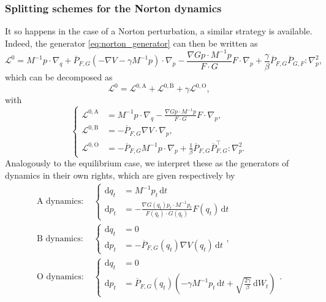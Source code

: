 \documentclass[pdflatex,sn-mathphys]{sn-jnl}%
\theoremstyle{thmstyleone}%
\theoremstyle{thmstyletwo}%
\theoremstyle{thmstylethree}%
\renewcommand{\d}{\mathrm{d}}
\newcommand{\cL}{\mathcal{L}}
\newcommand{\1}{\mathbbm{1}}
\begin{document}
\subsubsection{Splitting schemes for the Norton dynamics}
It so happens in the case of a Norton perturbation, a similar strategy is available. Indeed, the generator \eqref{eq:norton_generator} can then be written as
\begin{equation}
    \label{eq:norton_generator_langevin}
    \cL^0 = M^{-1}p\cdot \nabla_q + \overline{P}_{F,G}\left(-\nabla V -\gamma M^{-1}p\right)\cdot \nabla_p - \frac{\nabla G p \cdot M^{-1} p }{F\cdot G} F \cdot \nabla_p +\frac{\gamma}{\beta} \overline{P}_{F,G}\overline{P}_{G,F}:\nabla^2_p,
\end{equation}
which can be decomposed as
\begin{equation}
    \label{eq:norton_generator_splitting}
    \cL^{0} = \cL^{0,\mathrm{A}}+\cL^{0,\mathrm{B}}+\gamma\cL^{0,\mathrm{O}},
\end{equation}
with
\begin{equation}
    \label{eq:norton_generator_splitting_parts}
    \left\{
    \begin{aligned}
    \cL^{0,\mathrm{A}}&=M^{-1}p\cdot \nabla_q -\frac{\nabla G p \cdot M^{-1}p}{F\cdot G}F \cdot \nabla_p,\\
    \cL^{0,\mathrm{B}}&=-\overline{P}_{F,G}\nabla V\cdot \nabla_p,\\
    \cL^{0,\mathrm{O}}&=-\overline{P}_{F,G}M^{-1}p\cdot \nabla_p +\frac{1}{\beta} \overline{P}_{F,G}\overline{P}_{F,G}^\intercal:\nabla_p^2.
    \end{aligned}\right.
\end{equation}
Analogously to the equilibrium case, we interpret these as the generators of dynamics in their own rights, which are given respectively by
\begin{equation}
   \begin{aligned}
        \text{$\mathrm{A}$ dynamics: }&\left\{\begin{aligned}
            \d q_t &= M^{-1}p_t \,\d t\\
            \d p_t &= -\frac{\nabla G(q_t)p_t\cdot M^{-1}p_t}{F(q_t)\cdot G(q_t)}F(q_t)\,\d t
        \end{aligned}\right.\\
        \text{$\mathrm{B}$ dynamics: }&\left\{\begin{aligned}
            \d q_t &= 0\\
            \d p_t &=-\overline{P}_{F,G}(q_t)\nabla V(q_t)\,\d t
        \end{aligned}\right.,\\
        \text{$\mathrm{O}$ dynamics: }&\left\{\begin{aligned}
            \d q_t &= 0\\
            \d p_t &= \overline{P}_{F,G}(q_t)\left(-\gamma M^{-1}p_t\, \d t +\sqrt{\frac{2\gamma}\beta}\,\d W_t\right)
        \end{aligned}\right..
    \end{aligned}    
\end{equation}
\end{document}
